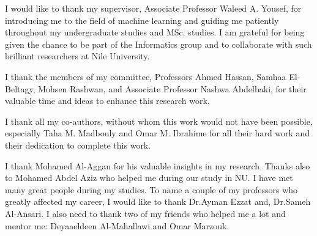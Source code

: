 I would like to thank my supervisor, Associate Professor Waleed A. Yousef, for introducing me to the field of machine learning and guiding me patiently throughout my undergraduate studies and MSc. studies. I am grateful for being given the chance to be part of the Informatics group and to collaborate with such brilliant researchers at Nile University.

I thank the members of my committee, Professors Ahmed Hassan, Samhaa El-Beltagy, Mohsen Rashwan, and Associate Professor Nashwa Abdelbaki, for their valuable time and ideas to enhance this research work. 

I thank all my co-authors, without whom this work would not have been possible, especially Taha M. Madbouly and Omar M. Ibrahime for all their hard work and their dedication to complete this work. 

I thank Mohamed Al-Aggan for his valuable insights in my research. Thanks also to Mohamed Abdel Aziz who helped me during our study in NU. I have met many great people during my studies. To name a couple of my professors who greatly affected my career, I would like to thank Dr.Ayman Ezzat and, Dr.Sameh Al-Ansari. I also need to thank two of my friends who helped me a lot and mentor me: Deyaaeldeen Al-Mahallawi and Omar Marzouk.




